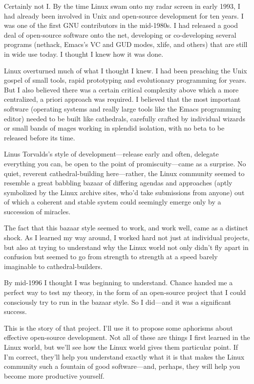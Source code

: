 \documentclass[a4paper,12pt,UTF8,twoside]{ctexbook}
\begin{document}
Certainly not I. By the time Linux swam onto my radar screen in early 1993, I had already been involved in Unix and open-source development for ten years. I was one of the first GNU contributors in the mid-1980s. I had released a good deal of open-source software onto the net, developing or co-developing several programs (nethack, Emacs's VC and GUD modes, xlife, and others) that are still in wide use today. I thought I knew how it was done.

Linux overturned much of what I thought I knew. I had been preaching the Unix gospel of small tools, rapid prototyping and evolutionary programming for years. But I also believed there was a certain critical complexity above which a more centralized, a priori approach was required. I believed that the most important software (operating systems and really large tools like the Emacs programming editor) needed to be built like cathedrals, carefully crafted by individual wizards or small bands of mages working in splendid isolation, with no beta to be released before its time.

Linus Torvalds's style of development—release early and often, delegate everything you can, be open to the point of promiscuity—came as a surprise. No quiet, reverent cathedral-building here—rather, the Linux community seemed to resemble a great babbling bazaar of differing agendas and approaches (aptly symbolized by the Linux archive sites, who'd take submissions from anyone) out of which a coherent and stable system could seemingly emerge only by a succession of miracles.

The fact that this bazaar style seemed to work, and work well, came as a distinct shock. As I learned my way around, I worked hard not just at individual projects, but also at trying to understand why the Linux world not only didn't fly apart in confusion but seemed to go from strength to strength at a speed barely imaginable to cathedral-builders.

By mid-1996 I thought I was beginning to understand. Chance handed me a perfect way to test my theory, in the form of an open-source project that I could consciously try to run in the bazaar style. So I did—and it was a significant success.

This is the story of that project. I'll use it to propose some aphorisms about effective open-source development. Not all of these are things I first learned in the Linux world, but we'll see how the Linux world gives them particular point. If I'm correct, they'll help you understand exactly what it is that makes the Linux community such a fountain of good software—and, perhaps, they will help you become more productive yourself.
\end{document}

